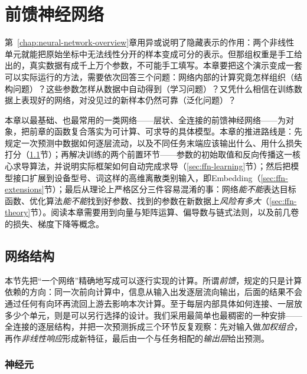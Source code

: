 \chapter{前馈神经网络}
\label{chap:feedforward-networks}

第~\ref{chap:neural-network-overview}章用异或说明了隐藏表示的作用：两个非线性单元就能把原始坐标中无法线性分开的样本变成可分的表示。但那组权重是手工给出的，真实数据有成千上万个参数，不可能手工填写。本章要把这个演示变成一套可以实际运行的方法，需要依次回答三个问题：网络内部的计算究竟怎样组织（结构问题）？这些参数怎样从数据中自动得到（学习问题）？又凭什么相信在训练数据上表现好的网络，对没见过的新样本仍然可靠（泛化问题）？

本章以最基础、也最常用的一类网络——层状、全连接的前馈神经网络——为对象，把前章的函数复合落实为可计算、可求导的具体模型。本章的推进路线是：先规定一次预测中数据如何逐层流动，以及不同任务末端应该输出什么、用什么损失打分（\ref{sec:ffn-structure}节）；再解决训练的两个前置环节——参数的初始取值和反向传播这一核心求导算法，并说明实际框架如何自动完成求导（\ref{sec:ffn-learning}节）；然后把模型接口扩展到设备型号、词这样的高维离散类别输入，即Embedding（\ref{sec:ffn-extensions}节）；最后从理论上严格区分三件容易混淆的事：网络\emph{能不能}表达目标函数、优化算法\emph{能不能}找到好参数、找到的参数在新数据上\emph{风险有多大}（\ref{sec:ffn-theory}节）。阅读本章需要用到向量与矩阵运算、偏导数与链式法则，以及前几卷的损失、梯度下降等概念。

\section{网络结构}
\label{sec:ffn-structure}

本节先把“一个网络”精确地写成可以逐行实现的计算。所谓\emph{前馈}，规定的只是计算依赖的方向：同一次前向计算中，信息从输入出发逐层流向输出，后面的结果不会通过任何有向环再流回上游去影响本次计算。至于每层内部具体如何连接、一层放多少个单元，则是可以另行选择的设计。我们采用最简单也最稠密的一种安排——全连接的逐层结构，并把一次预测拆成三个环节反复观察：先对输入做\emph{加权组合}，再作\emph{非线性响应}形成新特征，最后由一个与任务相配的\emph{输出层}给出预测。

\subsection{神经元}
\label{sec:ffn-neuron}

